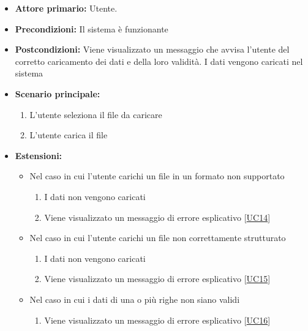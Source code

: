 \begin{itemize}
    \item \textbf{Attore primario:} Utente.
    \item \textbf{Precondizioni:} Il sistema è funzionante
    \item \textbf{Postcondizioni:} Viene visualizzato un messaggio che avvisa l'utente del corretto caricamento dei dati e della loro validità. 
                                   I dati vengono caricati nel sistema
    \item \textbf{Scenario principale:}
          \begin{enumerate}
              \item L'utente seleziona il file da caricare
              \item L'utente carica il file
          \end{enumerate}
    \item \textbf{Estensioni:}
    \begin{itemize}
        \item   Nel caso in cui l'utente carichi un file in un formato non supportato
                \begin{enumerate}
                    \item I dati non vengono caricati
                    \item Viene visualizzato un messaggio di errore esplicativo [\hyperref[sec:UC14 - Errore formato file]{UC14}] %
                \end{enumerate}
        \item   Nel caso in cui l'utente carichi un file non correttamente strutturato
                \begin{enumerate}
                    \item I dati non vengono caricati
                    \item Viene visualizzato un messaggio di errore esplicativo [\hyperref[sec:UC15 - Errore struttura dataset]{UC15}]
                \end{enumerate}
        \item   Nel caso in cui i dati di una o più righe non siano validi
                \begin{enumerate}
                    \item Viene visualizzato un messaggio di errore esplicativo [\hyperref[sec:UC16 - Errore validità riga]{UC16}] 
                \end{enumerate}
    \end{itemize} 
\end{itemize}
\newpage

